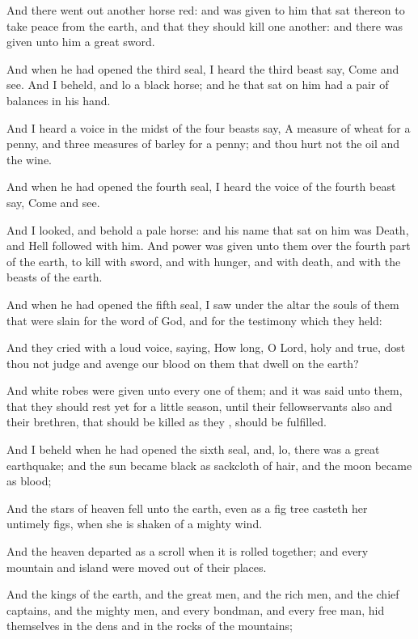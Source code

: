 {And there went
out
another
horse
{}
red:
and
{} was
given to
him that
sat
thereon to
take
peace
from the
earth,
and
that they should
kill one
another:
and there was
given unto
him a
great
sword.

And
when he had
opened the
third
seal, I
heard the
third
beast
say,
Come
and
see.
And I
beheld,
and
lo a
black
horse;
and
he that
sat
on
him
had a pair of
balances
in
his
hand.

And I
heard a
voice
in the
midst of the
four
beasts
say, A
measure of
wheat for a
penny,
and
three
measures of
barley for a
penny;
and
{} thou
hurt
not the
oil
and the
wine.

And
when he had
opened the
fourth
seal, I
heard the
voice of the
fourth
beast
say,
Come
and
see.

And I
looked,
and
behold a
pale
horse:
and
his
name
that
sat
on
him was
Death,
and
Hell
followed
with
him.
And
power was
given unto
them
over the fourth
part of the
earth, to
kill
with
sword,
and
with
hunger,
and
with
death,
and
with the
beasts of the
earth.

And
when he had
opened the
fifth
seal, I
saw
under the
altar the
souls of
them that were
slain
for the
word of
God,
and
for the
testimony
which they
held:

And they
cried with a
loud
voice,
saying,
How
long, O
Lord,
holy
and
true, dost
thou
not
judge
and
avenge
our
blood
on them that
dwell
on the
earth?

And
white
robes were
given unto every one of
them;
and it was
said unto
them,
that they should
rest
yet for a
little
season,
until
their
fellowservants
also
and
their
brethren, that should be
killed
as
they
{}, should
be
fulfilled.

And I
beheld
when he had
opened the
sixth
seal,
and,
lo, there
was a
great
earthquake;
and the
sun
became
black
as
sackcloth of
hair,
and the
moon
became
as
blood;

And the
stars of
heaven
fell
unto the
earth, even
as a fig
tree
casteth
her untimely
figs, when she is
shaken
of a
mighty
wind.

And the
heaven
departed
as a
scroll when it is rolled
together;
and
every
mountain
and
island were
moved
out of
their
places.

And the
kings of the
earth,
and the
great
men,
and the rich
men,
and the chief
captains,
and the mighty
men,
and
every
bondman,
and
every free
man,
hid
themselves
in the
dens
and
in the
rocks of the
mountains;

}

